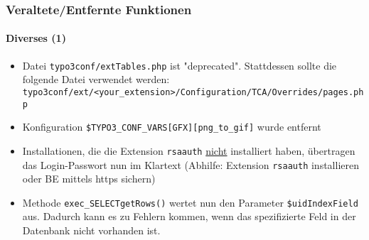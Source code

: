 \begin{frame}[fragile]
	\frametitle{Veraltete/Entfernte Funktionen}
	\framesubtitle{Diverses (1)}

	\begin{itemize}

		\item Datei \texttt{typo3conf/extTables.php} ist "deprecated". Stattdessen
			sollte die folgende Datei verwendet werden:\newline
			\tiny\texttt{typo3conf/ext/<your\_extension>/Configuration/TCA/Overrides/pages.php}\normalsize

		\item Konfiguration \texttt{\$TYPO3\_CONF\_VARS[GFX][png\_to\_gif]} wurde entfernt

		\item Installationen, die die Extension \texttt{rsaauth} \underline{nicht}
			installiert haben, übertragen das Login-Passwort nun im Klartext\newline
			\small(Abhilfe: Extension \texttt{rsaauth} installieren oder BE mittels https
			sichern)\normalsize

		\item Methode \texttt{exec\_SELECTgetRows()} wertet nun den Parameter
			\texttt{\$uidIndexField} aus. Dadurch kann es zu Fehlern kommen, wenn das
			spezifizierte Feld in der Datenbank nicht vorhanden ist.

	\end{itemize}

\end{frame}



